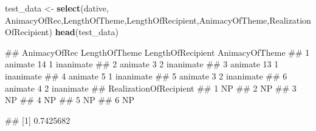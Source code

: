 \documentclass[
]{book}
\newenvironment{Shaded}{\begin{snugshade}}{\end{snugshade}}
\newcommand{\AttributeTok}[1]{\textcolor[rgb]{0.13,0.29,0.53}{#1}}
\newcommand{\CommentTok}[1]{\textcolor[rgb]{0.56,0.35,0.01}{\textit{#1}}}
\newcommand{\FloatTok}[1]{\textcolor[rgb]{0.00,0.00,0.81}{#1}}
\newcommand{\FunctionTok}[1]{\textcolor[rgb]{0.13,0.29,0.53}{\textbf{#1}}}
\newcommand{\NormalTok}[1]{#1}
\newcommand{\OtherTok}[1]{\textcolor[rgb]{0.56,0.35,0.01}{#1}}
\newcommand{\SpecialCharTok}[1]{\textcolor[rgb]{0.81,0.36,0.00}{\textbf{#1}}}
\newcommand{\StringTok}[1]{\textcolor[rgb]{0.31,0.60,0.02}{#1}}
\begin{document}
\begin{Shaded}
\begin{Highlighting}[]
\NormalTok{test\_data }\OtherTok{\textless{}{-}} \FunctionTok{select}\NormalTok{(dative, AnimacyOfRec,LengthOfTheme,LengthOfRecipient,AnimacyOfTheme,RealizationOfRecipient)}
\FunctionTok{head}\NormalTok{(test\_data)}
\end{Highlighting}
\end{Shaded}

\begin{Shaded}
\begin{Highlighting}[]
\NormalTok{\#\#   AnimacyOfRec LengthOfTheme LengthOfRecipient AnimacyOfTheme}
\NormalTok{\#\# 1      animate            14                 1      inanimate}
\NormalTok{\#\# 2      animate             3                 2      inanimate}
\NormalTok{\#\# 3      animate            13                 1      inanimate}
\NormalTok{\#\# 4      animate             5                 1      inanimate}
\NormalTok{\#\# 5      animate             3                 2      inanimate}
\NormalTok{\#\# 6      animate             4                 2      inanimate}
\NormalTok{\#\#   RealizationOfRecipient}
\NormalTok{\#\# 1                     NP}
\NormalTok{\#\# 2                     NP}
\NormalTok{\#\# 3                     NP}
\NormalTok{\#\# 4                     NP}
\NormalTok{\#\# 5                     NP}
\NormalTok{\#\# 6                     NP}
\end{Highlighting}
\end{Shaded}

\begin{Shaded}
\end{Shaded}

\begin{Shaded}
\begin{Highlighting}[]
\NormalTok{\#\# [1] 0.7425682}
\end{Highlighting}
\end{Shaded}


  
\end{document}
